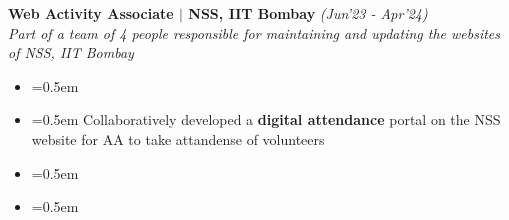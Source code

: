 \documentclass{article}
\begin{document}
{\fontsize{12}{12} {\textbf{Web Activity  Associate $|$ NSS, IIT Bombay}}} \hfill{\sl \small (Jun'23 - Apr'24)}\\
{\it Part of a team of 4 people responsible for maintaining and updating the websites of NSS, IIT Bombay}
\vspace{-15pt}\\
\begin{itemize}[label=\textcolor{myblue}{\textbullet},itemsep = -1.25mm, leftmargin=5.5mm]

\item{}\font=0.5em 
\item{}\font=0.5em Collaboratively developed a \textbf{digital attendance} portal  on the NSS website for AA to take attandense of volunteers
\item{}\font=0.5em 
\item{}\font=0.5em 
\end{itemize}
\end{document}
